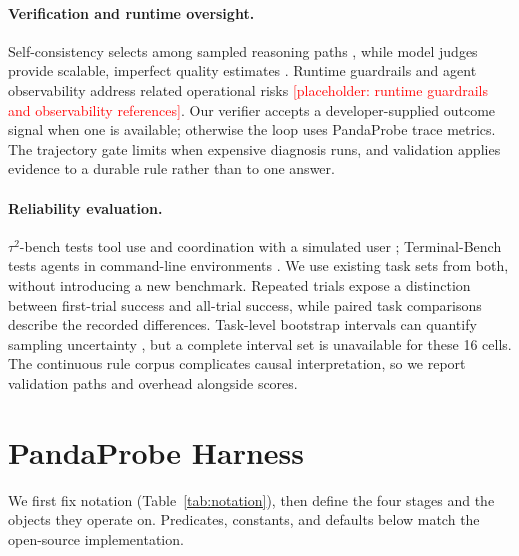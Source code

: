 \documentclass[11pt,letterpaper]{article}
\begin{document}
\paragraph{Verification and runtime oversight.}
Self-consistency selects among sampled reasoning paths
\citep{wang2023selfconsistency}, while model judges provide scalable, imperfect
quality estimates \citep{zheng2023judging}. Runtime guardrails and agent
observability address related operational risks
\textcolor{red}{[placeholder: runtime guardrails and observability references]}.
Our verifier accepts a developer-supplied outcome signal when one is available;
otherwise the loop uses PandaProbe trace metrics. The trajectory gate limits
when expensive diagnosis runs, and validation applies evidence to a durable
rule rather than to one answer.

\paragraph{Reliability evaluation.}
$\tau^2$-bench tests tool use and coordination with a simulated user
\citep{barres2025tau}; Terminal-Bench tests agents in command-line
environments \citep{merrill2026terminal}. We use existing task sets from both,
without introducing a new benchmark. Repeated trials expose a distinction
between first-trial success and all-trial success, while paired task
comparisons describe the recorded differences. Task-level bootstrap
intervals can quantify sampling uncertainty \citep{efron1993bootstrap},
but a complete interval set is unavailable for these 16 cells. The
continuous rule corpus complicates causal interpretation, so we report
validation paths and overhead alongside scores.

\section{PandaProbe Harness}
\label{sec:harness}

We first fix notation (Table~\ref{tab:notation}), then define the four stages and the objects
they operate on. Predicates, constants, and defaults below match the open-source implementation.
\end{document}
